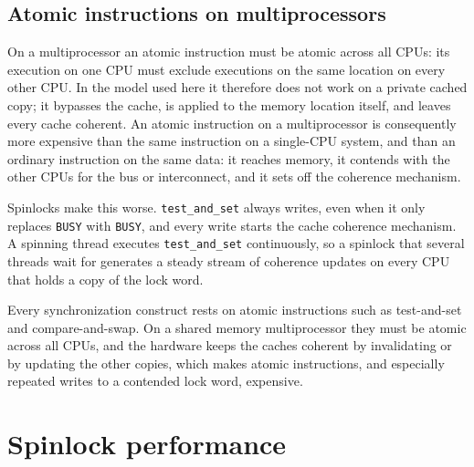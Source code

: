 \documentclass[../main.tex]{subfiles}
\begin{document}
\subsection{Atomic instructions on multiprocessors}

On a multiprocessor an atomic instruction must be atomic across all CPUs:
its execution on one CPU must exclude executions on the same location on
every other CPU.  In the model used here it therefore does not work on a
private cached copy; it bypasses the cache, is applied to the memory
location itself, and leaves every cache coherent.  An
atomic instruction on a multiprocessor is consequently more expensive than
the same instruction on a single-CPU system, and than an ordinary
instruction on the same data: it reaches memory, it contends with the other
CPUs for the bus or interconnect, and it sets off the coherence
mechanism.

Spinlocks make this worse.  \texttt{test\_and\_set} always writes, even
when it only replaces \texttt{BUSY} with \texttt{BUSY}, and every write
starts the cache coherence mechanism.  A spinning thread executes
\texttt{test\_and\_set} continuously, so a spinlock that several threads
wait for generates a steady stream of coherence updates on every CPU that
holds a copy of the lock word.

\begin{keypoint}
  Every synchronization construct rests on atomic instructions such as
  test-and-set and compare-and-swap.  On a shared memory multiprocessor
  they must be atomic across all CPUs, and the hardware keeps the caches
  coherent by invalidating or by updating the other copies, which makes
  atomic instructions, and especially repeated writes to a contended lock
  word, expensive.
\end{keypoint}

\section{Spinlock performance}
\label{sec:l10-spin-perf}
\end{document}
